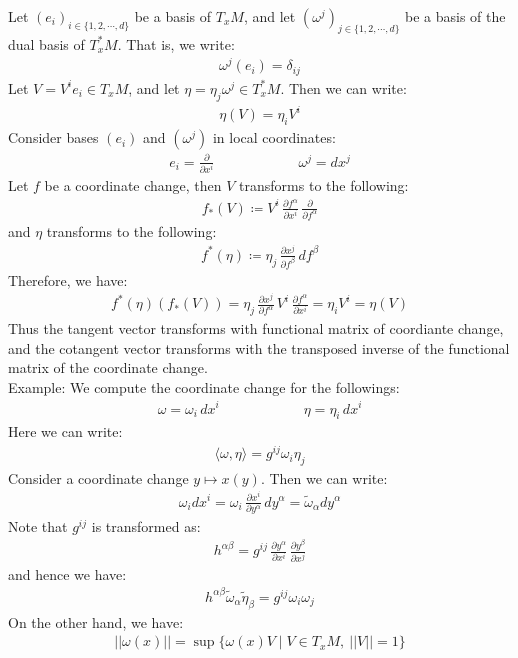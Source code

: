 \documentclass[11pt]{book}
\theoremstyle{break}
\theoremstyle{break}
\newcommand{\pd}{\partial}
\newcommand{\that}[1]{\widetilde{#1}}
\newcommand{\example}{\color{green}Example: \color{black}}
\begin{document}
Let $(e_i)_{i \in \{1,2,\cdots, d\}}$ be a basis of $T_xM$, and let $(\omega^j)_{j \in \{1,2,\cdots, d\}}$ be a basis of the dual basis of $T^*_xM$. That is, we write:
\begin{align*}
\omega^j(e_i) = \delta_{ij}
\end{align*}
Let $V = V^i e_i \in T_xM$, and let $\eta = \eta_j\omega^j \in T_x^*M$. Then we can write:
\begin{align*}
\eta(V) = \eta_iV^i
\end{align*}
Consider bases $(e_i)$ and $(\omega^j)$ in local coordinates:
\begin{align*}
e_i = \frac{\pd}{\pd x^i} \qquad\qquad\qquad \omega^j = dx^j
\end{align*}
Let $f$ be a coordinate change, then $V$ transforms to the following:
\begin{align*}
f_*(V)\coloneqq V^i\, \frac{\pd f^\alpha}{\pd x^i}\, \frac{\pd}{\pd f^\alpha}
\end{align*}
and $\eta$ transforms to the following:
\begin{align*}
f^*(\eta) \coloneqq \eta_j\, \frac{\pd x^j}{\pd f^\beta}\, df^{\beta}
\end{align*}
Therefore, we have:
\begin{align*}
f^*(\eta) (f_*(V)) = \eta_j\, \frac{\pd x^j}{\pd f^\alpha}\,V^i\, \frac{\pd f^\alpha}{\pd x^i} = \eta_i V^i  = \eta(V)
\end{align*}
Thus the tangent vector transforms with functional matrix of coordiante change, and the cotangent vector transforms with the transposed inverse of the functional matrix of the coordinate change. \\

\example We compute the coordinate change for the followings:
\begin{align*}
\omega = \omega_i\, dx^i \qquad\qquad\qquad \eta = \eta_i\,dx^i
\end{align*}
Here we can write:
\begin{align*}
\langle \omega, \eta\rangle = g^{ij}\omega_i \eta_j
\end{align*}
Consider a coordinate change $y \mapsto x(y)$. Then we can write:
\begin{align*}
\omega_i dx^i = \omega_i \,\frac{\pd x^i}{\pd y^\alpha}\, dy^\alpha = \that{\omega}_\alpha dy^\alpha
\end{align*}
Note that $g^{ij}$ is transformed as:
\begin{align*}
h^{\alpha\beta} = g^{ij}\, \frac{\pd y^{\alpha}}{\pd x^i}\, \frac{\pd y^{\beta}}{\pd x^j}
\end{align*}
and hence we have:
\begin{align*}
h^{\alpha\beta}\that{\omega}_\alpha \that{\eta}_\beta = g^{ij}\omega_i \omega_j
\end{align*}
On the other hand, we have:
\begin{align*}
|| \omega(x) || = \sup\{ \omega(x) V \mid V \in T_xM, \ ||V|| = 1\}
\end{align*}
\end{document}
